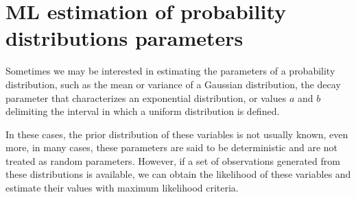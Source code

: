 \section{ML estimation of probability distributions parameters}

Sometimes we may be interested in estimating the parameters of a probability distribution, such as the mean or variance of a Gaussian distribution, the decay parameter that characterizes an exponential distribution, or values $a$ and $b$ delimiting the interval in which a uniform distribution is defined.

In these cases, the prior distribution of these variables is not usually known, even more, in many cases, these parameters are said to be deterministic and are not treated as random parameters. However, if a set of observations generated from these distributions is available, we can obtain the likelihood of these variables and estimate their values with maximum likelihood criteria.


